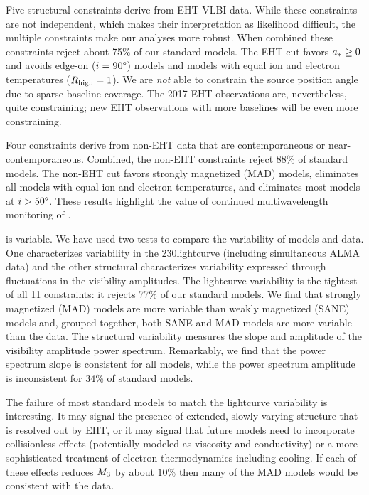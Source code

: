 Five structural constraints derive from EHT VLBI data.
While these constraints are not independent, which makes their interpretation as likelihood difficult, the multiple constraints make our analyses more robust.
When combined these constraints reject about 75\% of our standard models.  The EHT cut favors $a_* \ge 0$ and avoids edge-on ($i = 90\degree$) models and models with equal ion and electron temperatures ($R_\mathrm{high} = 1$).
We are {\em not} able to constrain the source position angle due to sparse baseline coverage.
The 2017 EHT observations are, nevertheless, quite constraining; new EHT observations with more baselines will be even more constraining.

Four constraints derive from non-EHT data that are contemporaneous or near-contemporaneous.  Combined, the non-EHT constraints reject 88\% of standard models.  The non-EHT cut favors strongly magnetized (MAD) models, eliminates all models with equal ion and electron temperatures, and eliminates most models at $i > 50\degree$.  These results highlight the value of continued multiwavelength monitoring of \sgra.

\sgra is variable.  We have used two tests to compare the variability of models and data. One characterizes variability in the 230\GHz lightcurve (including simultaneous ALMA data) and the other structural characterizes variability expressed through fluctuations in the visibility amplitudes.  The lightcurve variability is the tightest of all 11 constraints: it rejects 77\% of our standard models.  We find that strongly magnetized (MAD) models are more variable than weakly magnetized (SANE) models and, grouped together, both SANE and MAD models are more variable than the data.  The structural variability measures the slope and amplitude of the visibility amplitude power spectrum.  Remarkably, we find that the power spectrum slope is consistent for all models, while the power spectrum amplitude is inconsistent for 34\% of standard models.

The failure of most standard models to match the lightcurve variability is interesting.  It may signal the presence of extended, slowly varying structure that is resolved out by EHT, or it may signal that future models need to incorporate collisionless effects (potentially modeled as viscosity and conductivity) or a more sophisticated treatment of electron thermodynamics including cooling.  If each of these effects reduces $M_{3}$ by about $10\%$ then many of the MAD models would be consistent with the data.

